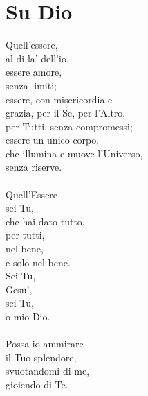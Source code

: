 \section{Su Dio}

\begin{haiku}
Quell'essere,\\
al di la' dell'io,\\
essere amore,\\
senza limiti;\\
essere, con misericordia e\\
grazia, per il Se, per l'Altro, \\
per Tutti, senza compromessi;\\
essere un unico corpo,\\
che illumina e muove l'Universo,\\
senza riserve.\\
\leavevmode\\
Quell'Essere\\
sei Tu,\\
che hai dato tutto,\\
per tutti,\\
nel bene,\\
e solo nel bene.\\
Sei Tu,\\
Gesu',\\
sei Tu, \\
o mio Dio.\\
\leavevmode\\
Possa io ammirare \\
il Tuo splendore,\\
svuotandomi di me,\\
gioiendo di Te.\\
\end{haiku}


